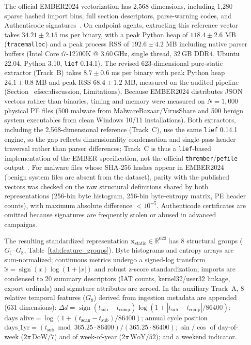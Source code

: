 \documentclass[Number]{sn-jnl}
\begin{document}
The official EMBER2024 vectorization has 2{,}568 dimensions, including 1{,}280 sparse hashed import bins, full section descriptors, parse-warning codes, and Authenticode signatures~\cite{joyce2025ember2024}. On endpoint agents, extracting this reference vector takes $34.21 \pm 2.15$ ms per binary, with a peak Python heap of $118.4 \pm 2.6$ MB (\texttt{tracemalloc}) and a peak process RSS of $192.6 \pm 4.2$ MB including native parser buffers (Intel Core i7-12700K @ 3.60\,GHz, single thread, 32\,GB DDR4, Ubuntu 22.04, Python 3.10, \texttt{lief} 0.14.1). The revised 623-dimensional pure-static extractor (Track~B) takes $8.7\pm0.6$ ms per binary with peak Python heap $24.1\pm0.8$ MB and peak RSS $68.4\pm1.2$ MB, measured on the audited pipeline (Section~
ef{sec:discussion}, Limitations). Because EMBER2024 distributes JSON vectors rather than binaries, timing and memory were measured on $N=1{,}000$ physical PE files (500 malware from MalwareBazaar/VirusShare and 500 benign system executables from clean Windows 10/11 installations).  Both extractors, including the 2{,}568-dimensional reference (Track~C), use the same \texttt{lief} 0.14.1 engine, so the gap reflects dimensionality condensation and single-pass header traversal rather than parser differences; Track~C is thus a \texttt{lief}-based implementation of the EMBER specification, not the official \texttt{thrember}/\texttt{pefile} output~\cite{thrember}. For malware files whose SHA-256 hashes appear in EMBER2024 (benign system files are absent from the dataset), parity with the published vectors was checked on the raw structural definitions shared by both representations (256-bin byte histogram, 256-bin byte-entropy matrix, PE header counts), with maximum absolute difference $<10^{-5}$. Authenticode certificates are omitted because signatures are frequently stolen or abused in advanced campaigns.

The resulting standardized representation $\mathbf{x}_\text{static}\in\mathbb{R}^{623}$ has 8 structural groups ($G_1$--$G_8$, Table~\ref{tab:feature_groups}). Byte histograms and entropy arrays are sum-normalized; continuous metrics undergo a signed-log transform $\tilde{x}=\operatorname{sign}(x)\log(1+|x|)$ and robust z-score standardization; imports are condensed to 20 summary descriptors (IAT counts, kernel32/user32 linkage, export ordinals) and signature attributes are zeroed. In the auxiliary Track~A, 8 relative temporal features ($G_9$) derived from ingestion metadata are appended (631 dimensions): $\Delta d=\operatorname{sign}(t_\text{sub}-t_\text{comp})\log(1+|t_\text{sub}-t_\text{comp}|/86400)$; $\text{days\_alive}=\log(1+(t_\text{scan}-t_\text{sub})/86400)$; annual cycle position $\text{days\_1yr}=(t_\text{sub}\bmod 365.25\cdot 86400)/(365.25\cdot 86400)$; $\sin/\cos$ of day-of-week ($2\pi\,\text{DoW}/7$) and of week-of-year ($2\pi\,\text{WoY}/52$); and a weekend indicator.
\end{document}

